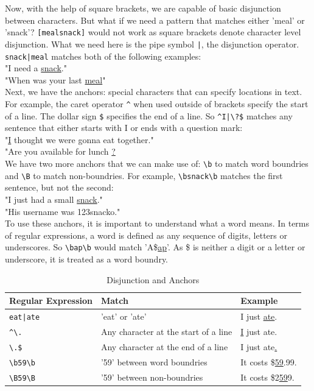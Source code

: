 Now, with the help of square brackets, we are capable of basic disjunction between characters. 
But what if we need a pattern that matches either 'meal' or 'snack'?
\texttt{[mealsnack]} would not work as square brackets denote character level disjunction. 
What we need here is the pipe symbol \texttt{|}, the disjunction operator.
\texttt{snack|meal} matches both of the following examples:\\
"I need a \underline{snack}."\\
"When was your last \underline{meal}"\\
Next, we have the anchors: special characters that can specify locations in text.
For example, the caret operator \texttt{\^{}} when used outside of brackets specify the start of a line.
The dollar sign \texttt{\$} specifies the end of a line.
So \texttt{\^{}I|\textbackslash?\$} matches any sentence that either starts with I or ends with a question mark:\\
"\underline{I} thought we were gonna eat together."\\
"Are you available for lunch \underline{?}\\
We have two more anchors that we can make use of:
\texttt{\textbackslash b} to match word boundries and \texttt{\textbackslash B} to match non-boundries.
For example, \texttt{\textbackslash bsnack\textbackslash b} matches the first sentence, but not the second:\\
"I just had a small \underline{snack}."\\
"His username was 123snacko."\\
To use these anchors, it is important to understand what a word means.
In terms of regular expressions, a word is defined as any sequence of digits, letters or underscores.
So \texttt{\textbackslash bap\textbackslash b} would match 'A\$\underline{ap}'.
As \$ is neither a digit or a letter or underscore, it is treated as a word boundry.

\begin{table}[htbp]
  \caption[Regular Expression Disjunction and Anchors]{Disjunction and Anchors}\label{tab:re_da}		
  \centering
  \begin{tabular}{l l l}
    Regular Expression&Match&Example\\ \toprule
    \texttt{eat|ate}&'eat' or 'ate'&I just \underline{ate}.\\ \hline
    \texttt{\^{}\textbackslash .}&Any character at the start of a line&\underline{I} just ate.\\ \hline
    \texttt{\textbackslash .\$}&Any character at the end of a line&I just ate\underline{.}\\ \hline
    \texttt{\textbackslash b59\textbackslash b}&'59' between word boundries&It costs \$\underline{59}.99.\\ \hline
    \texttt{\textbackslash B59\textbackslash B}&'59' between non-boundries&It costs \$2\underline{59}9.\\ \hline
  \end{tabular}
\end{table}


